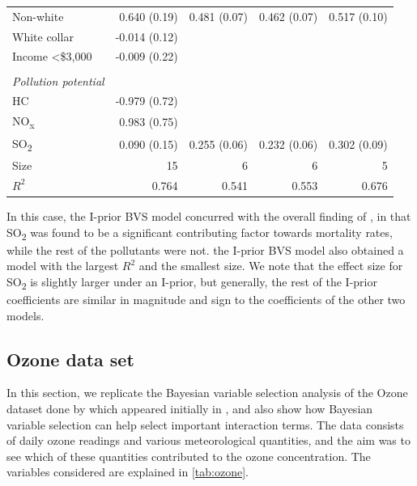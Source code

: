 \documentclass[11pt,twoside,openright]{report}
\begin{document}
\begin{table}[htb]
\begin{tabular}{lrrrr}
\hspace{0.5em} Non-white             & 0.640 (0.19)                 & 0.481 (0.07)   & 0.462 (0.07)      &  0.517 (0.10)       \\
\hspace{0.5em} White collar          & {\color{grymath} -0.014 (0.12)} &                &                   &         \\
\hspace{0.5em} Income <\$3,000         & {\color{grymath} -0.009 (0.22)} &                &                   &         \\
\\
\emph{Pollution potential} \\
\hspace{0.5em} HC    & {\color{grymath} -0.979 (0.72)} &                &                   &         \\
\hspace{0.5em} NO\textsubscript{x} & {\color{grymath} 0.983 (0.75)}  &                &                   &         \\
\hspace{0.5em}  SO\textsubscript{2} & {\color{grymath} 0.090 (0.15)}  & 0.255 (0.06)   & 0.232 (0.06)      &  0.302 (0.09)        \\
\midrule
Size                     & 15                           & 6              & 6                 & 5         \\
$R^2$                    & 0.764                        & 0.541          & 0.553             & 0.676        \\ \bottomrule
\end{tabular}
\end{table}

In this case, the I-prior BVS model concurred with the overall finding of \citet{McDonald1973}, in that SO\textsubscript{2} was found to be a significant contributing factor towards mortality rates, while the rest of the pollutants were not.
the I-prior BVS model also obtained a model with the largest $R^2$ and the smallest size.
We note that the effect size for SO\textsubscript{2} is slightly larger under an I-prior, but generally, the rest of the I-prior coefficients are similar in magnitude and sign to the coefficients of the other two models.

\vspace{-0.5em}
\subsection{Ozone data set}
\label{sec:ozone}
\vspace{-0.5em}
In this section, we replicate the Bayesian variable selection analysis of the Ozone dataset done by \citet[abbr. C\&M]{Casella2006} which appeared initially in \citet[abbr. B\&F]{Breiman1985}, and also show how Bayesian variable selection can help select important interaction terms. 
The data consists of daily ozone readings and various meteorological quantities, and the aim was to see which of these quantities contributed to the ozone concentration. 
The variables considered are explained in \cref{tab:ozone}. 
\end{document}
